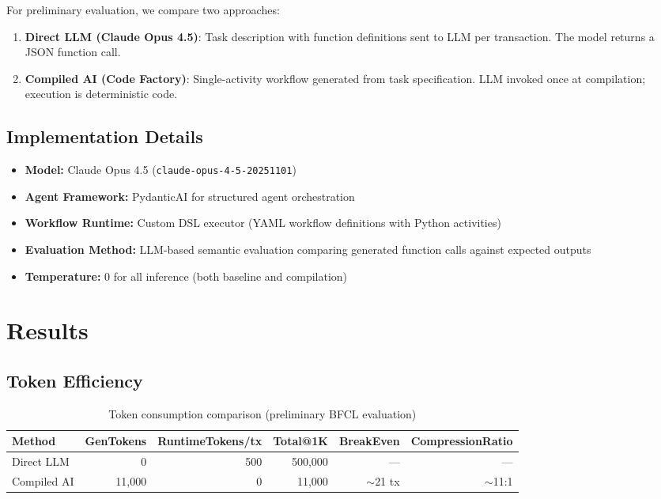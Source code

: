 \documentclass[11pt]{article}
\begin{document}
For preliminary evaluation, we compare two approaches:

\begin{enumerate}
    \item \textbf{Direct LLM (Claude Opus 4.5)}: Task description with function definitions sent to LLM per transaction. The model returns a JSON function call.
    \item \textbf{Compiled AI (Code Factory)}: Single-activity workflow generated from task specification. LLM invoked once at compilation; execution is deterministic code.
\end{enumerate}

\subsection{Implementation Details}

\begin{itemize}
    \item \textbf{Model:} Claude Opus 4.5 (\texttt{claude-opus-4-5-20251101})
    \item \textbf{Agent Framework:} PydanticAI for structured agent orchestration
    \item \textbf{Workflow Runtime:} Custom DSL executor (YAML workflow definitions with Python activities)
    \item \textbf{Evaluation Method:} LLM-based semantic evaluation comparing generated function calls against expected outputs
    \item \textbf{Temperature:} 0 for all inference (both baseline and compilation)
\end{itemize}

\section{Results}
\label{sec:results}

\subsection{Token Efficiency}

\begin{table}[ht]
\centering
\caption{Token consumption comparison (preliminary BFCL evaluation)}
\label{tab:token-results}
\begin{tabular}{lrrrrr}
\toprule
Method & GenTokens & RuntimeTokens/tx & Total@1K & BreakEven & CompressionRatio \\
\midrule
Direct LLM & 0 & 500 & 500,000 & --- & --- \\
Compiled AI & 11,000 & 0 & 11,000 & $\sim$21 tx & $\sim$11:1 \\
\bottomrule
\end{tabular}
\end{table}
\end{document}

